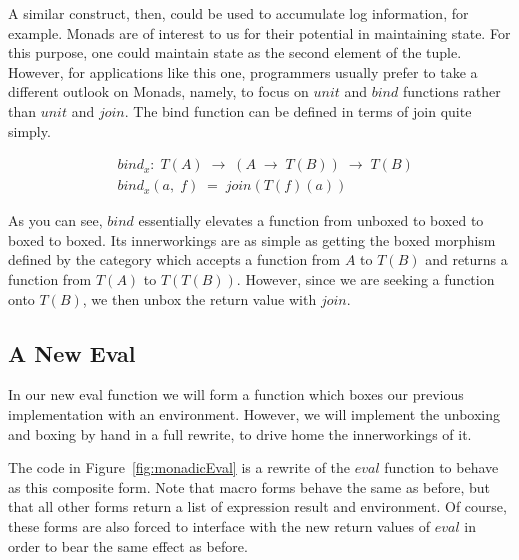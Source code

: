 A similar construct, then, could be used to accumulate log information, for example.
Monads are of interest to us for their potential in maintaining state. For this
purpose, one could maintain state as the second element of the tuple. However, for
applications like this one, programmers usually prefer to take a different outlook on
Monads, namely, to focus on $unit$ and $bind$ functions rather than $unit$ and $join$.
The bind function can be defined in terms of join quite simply.

\begin{figure}[htp]
\footnotesize
\caption{}\label{}
\begin{align*}
& bind_{x}: \; T(A) \; \to \; (A \; \to \; T(B)) \; \to \; T(B)
\\& bind_{x}(a, \; f) \; = \; join(T(f)(a))
\end{align*}
\end{figure}

As you can see, $bind$ essentially elevates a function from unboxed to boxed to boxed
to boxed. Its innerworkings are as simple as getting the boxed morphism defined by the
category which accepts a function from $A$ to $T(B)$ and returns a function from $T(A)$
to $T(T(B))$. However, since we are seeking a function onto $T(B)$, we then unbox the
return value with $join$.

\subsection{A New Eval}
In our new eval function we will form a function which boxes our previous
implementation with an environment. However, we will implement the unboxing
and boxing by hand in a full rewrite, to drive home the innerworkings of it.

The code in Figure~\ref{fig:monadicEval} is a rewrite of the $eval$ function to
behave as this composite form. Note that macro forms behave the same as before,
but that all other forms return a list of expression result and environment. Of
course, these forms are also forced to interface with the new return values of
$eval$ in order to bear the same effect as before.

